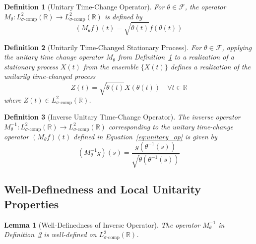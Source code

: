 \documentclass{article}
\newtheorem{definition}{Definition}
\newtheorem{lemma}{Lemma}
{\theorembodyfont{\rmfamily}\newtheorem{remark}{Remark}}
\begin{document}
\begin{definition}
  [Unitary Time-Change Operator]\label{def:unitary_op} For $\theta \in
  \mathcal{F}$, the operator $M_{\theta} : L^2_{\sigma \text{-comp}}
  (\mathbb{R}) \to L^2_{\sigma \text{-comp}} (\mathbb{R})$ is defined by
  \begin{equation}
    \label{eq:unitary_op} (M_{\theta} f) (t) = \sqrt{\dot{\theta} (t)} f
    (\theta (t))
  \end{equation}
\end{definition}

\begin{definition}
  [Unitarily Time-Changed Stationary Process]\label{def:time_changed_proc} For
  $\theta \in \mathcal{F}$, applying the unitary time change operator
  $M_{\theta}$ from Definition~\ref{def:unitary_op} to a realization of a
  stationary process $X (t)$ from the ensemble $\{X (t)\}$ defines a
  realization of the unitarily time-changed process
  \begin{equation}
    \label{eq:time_change} Z (t) = \sqrt{\dot{\theta} (t)} X (\theta (t))
    \quad \forall t \in \mathbb{R}
  \end{equation}
  where $Z (t) \in L^2_{\sigma \text{-comp}} (\mathbb{R})$.
\end{definition}

\begin{definition}
  [Inverse Unitary Time-Change Operator]\label{def:inverse_unitary_op} The
  inverse operator $M_{\theta}^{- 1} : L^2_{\sigma \text{-comp}} (\mathbb{R})
  \to L^2_{\sigma \text{-comp}} (\mathbb{R})$ corresponding to the unitary
  time-change operator $(M_{\theta} f) (t)$ defined in
  Equation~\eqref{eq:unitary_op} is given by
  \begin{equation}
    \label{eq:unitary_inverse} (M_{\theta}^{- 1} g) (s) = \frac{g (\theta^{-
    1} (s))}{\sqrt{\dot{\theta} (\theta^{- 1} (s))}}
  \end{equation}
\end{definition}

\subsection{Well-Definedness and Local Unitarity Properties}

\begin{lemma}
  [Well-Definedness of Inverse Operator]\label{lem:inverse_well_defined} The
  operator $M_{\theta}^{- 1}$ in Definition~\ref{def:inverse_unitary_op} is
  well-defined on $L^2_{\sigma \text{-comp}} (\mathbb{R})$.
\end{lemma}
\end{document}
